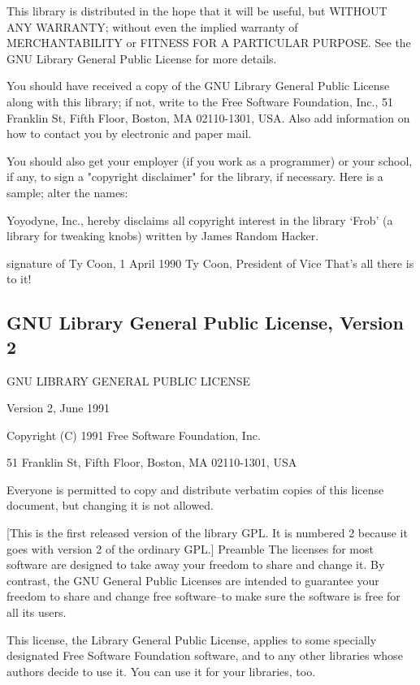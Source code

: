 This library is distributed in the hope that it will be useful,
but WITHOUT ANY WARRANTY; without even the implied warranty of
MERCHANTABILITY or FITNESS FOR A PARTICULAR PURPOSE.  See the GNU
Library General Public License for more details.

You should have received a copy of the GNU Library General Public
License along with this library; if not, write to the
Free Software Foundation, Inc., 51 Franklin St, Fifth Floor,
Boston, MA  02110-1301, USA.
Also add information on how to contact you by electronic and paper mail. 

You should also get your employer (if you work as a programmer) or your school, if any, to sign a "copyright disclaimer" for the library, if necessary. Here is a sample; alter the names: 

Yoyodyne, Inc., hereby disclaims all copyright interest in
the library `Frob' (a library for tweaking knobs) written
by James Random Hacker.

signature of Ty Coon, 1 April 1990
Ty Coon, President of Vice
That's all there is to it!






\newpage	
\subsection{GNU Library General Public License, Version 2}
\label{LGPLv2}
\begin{center}
	GNU LIBRARY GENERAL PUBLIC LICENSE
	
	Version 2, June 1991 
\end{center}


\noindent Copyright (C) 1991 Free Software Foundation, Inc.

51 Franklin St, Fifth Floor, Boston, MA  02110-1301, USA


Everyone is permitted to copy and distribute verbatim copies
of this license document, but changing it is not allowed.

[This is the first released version of the library GPL.  It is
numbered 2 because it goes with version 2 of the ordinary GPL.]
Preamble
The licenses for most software are designed to take away your freedom to share and change it. By contrast, the GNU General Public Licenses are intended to guarantee your freedom to share and change free software--to make sure the software is free for all its users. 

This license, the Library General Public License, applies to some specially designated Free Software Foundation software, and to any other libraries whose authors decide to use it. You can use it for your libraries, too. 

